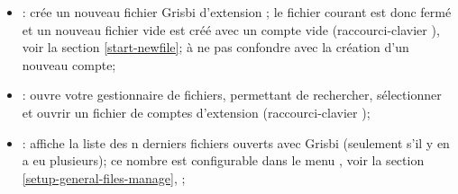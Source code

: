\begin{minipage}{.66\linewidth}
	\vspace{3mm}
	\begin{itemize}
		\item {}: crée un nouveau fichier Grisbi d'\gls{extension} ; le fichier courant est donc fermé et un nouveau fichier vide est créé avec un compte vide (raccourci-clavier ), voir la section \vref{start-newfile}; à ne pas confondre avec la création d'un nouveau compte;	 
		\item {}: ouvre votre gestionnaire de fichiers, permettant de rechercher, sélectionner et ouvrir un fichier de comptes d'\gls{extension}  (raccourci-clavier );
		\item {}: affiche la liste des n derniers fichiers ouverts avec Grisbi (seulement s'il y en a eu plusieurs); ce nombre est configurable dans le menu , voir la section \vref{setup-general-files-manage}, ;
	\end{itemize}
\end{minipage}
